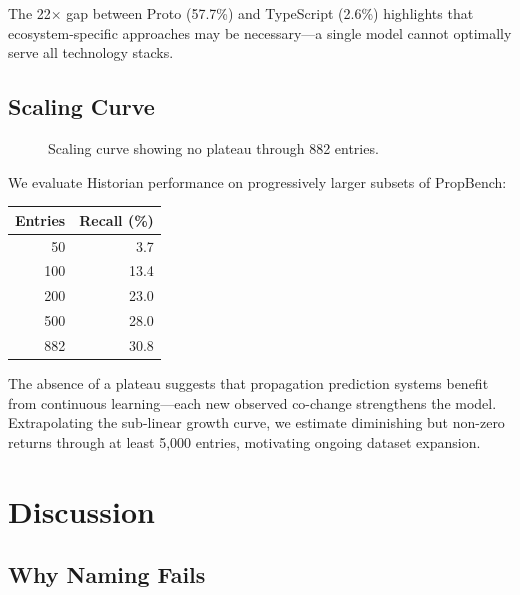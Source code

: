 \documentclass[sigconf,nonacm]{acmart}
\begin{document}
The 22$\times$ gap between Proto (57.7\%) and TypeScript (2.6\%) highlights that ecosystem-specific approaches may be necessary---a single model cannot optimally serve all technology stacks.

\subsection{Scaling Curve}

\begin{figure}[h]
\centering
{}
\caption{Scaling curve showing no plateau through 882 entries.}
\label{fig:scaling}
\end{figure}

We evaluate Historian performance on progressively larger subsets of PropBench:

\begin{center}
\begin{tabular}{rr}
\toprule
\textbf{Entries} & \textbf{Recall (\%)} \\
\midrule
50 & 3.7 \\
100 & 13.4 \\
200 & 23.0 \\
500 & 28.0 \\
882 & 30.8 \\
\bottomrule
\end{tabular}
\end{center}

The absence of a plateau suggests that propagation prediction systems benefit from continuous learning---each new observed co-change strengthens the model. Extrapolating the sub-linear growth curve, we estimate diminishing but non-zero returns through at least 5{,}000 entries, motivating ongoing dataset expansion.

\section{Discussion}
\label{sec:discussion}

\subsection{Why Naming Fails}
\end{document}
